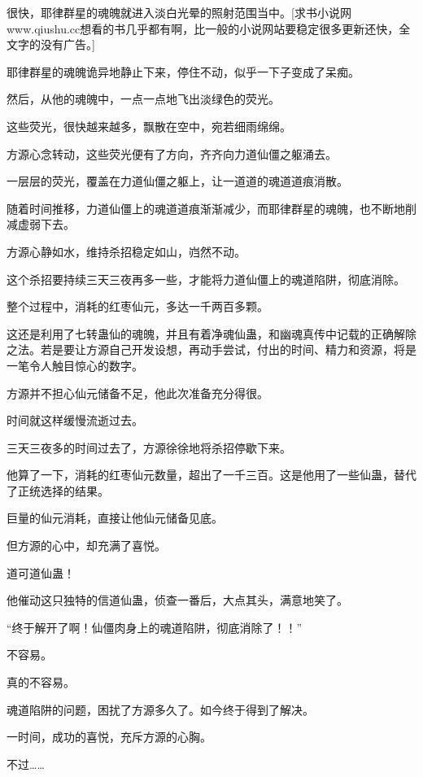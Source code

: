 
\begin{this_body}

很快，耶律群星的魂魄就进入淡白光晕的照射范围当中。[求书小说网www.qiushu.cc想看的书几乎都有啊，比一般的小说网站要稳定很多更新还快，全文字的没有广告。]

耶律群星的魂魄诡异地静止下来，停住不动，似乎一下子变成了呆痴。

然后，从他的魂魄中，一点一点地飞出淡绿色的荧光。

这些荧光，很快越来越多，飘散在空中，宛若细雨绵绵。

方源心念转动，这些荧光便有了方向，齐齐向力道仙僵之躯涌去。

一层层的荧光，覆盖在力道仙僵之躯上，让一道道的魂道道痕消散。

随着时间推移，力道仙僵上的魂道道痕渐渐减少，而耶律群星的魂魄，也不断地削减虚弱下去。

方源心静如水，维持杀招稳定如山，岿然不动。

这个杀招要持续三天三夜再多一些，才能将力道仙僵上的魂道陷阱，彻底消除。

整个过程中，消耗的红枣仙元，多达一千两百多颗。

这还是利用了七转蛊仙的魂魄，并且有着净魂仙蛊，和幽魂真传中记载的正确解除之法。若是要让方源自己开发设想，再动手尝试，付出的时间、精力和资源，将是一笔令人触目惊心的数字。

方源并不担心仙元储备不足，他此次准备充分得很。

时间就这样缓慢流逝过去。

三天三夜多的时间过去了，方源徐徐地将杀招停歇下来。

他算了一下，消耗的红枣仙元数量，超出了一千三百。这是他用了一些仙蛊，替代了正统选择的结果。

巨量的仙元消耗，直接让他仙元储备见底。

但方源的心中，却充满了喜悦。

道可道仙蛊！

他催动这只独特的信道仙蛊，侦查一番后，大点其头，满意地笑了。

“终于解开了啊！仙僵肉身上的魂道陷阱，彻底消除了！！”

不容易。

真的不容易。

魂道陷阱的问题，困扰了方源多久了。如今终于得到了解决。

一时间，成功的喜悦，充斥方源的心胸。

不过……


\end{this_body}
